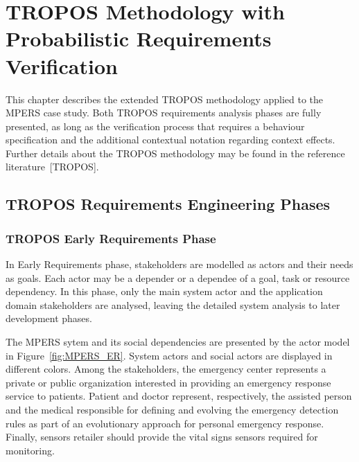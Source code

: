 \chapter{TROPOS Methodology with Probabilistic Requirements Verification}\label{ch_proposal}

This chapter describes the extended TROPOS methodology applied to the MPERS case study. Both TROPOS requirements analysis phases are fully presented, as long as the verification process that requires a behaviour specification and the additional contextual notation regarding context effects. Further details about the TROPOS methodology may be found in the reference literature~[TROPOS]. 

\section{TROPOS Requirements Engineering Phases}

\subsection{TROPOS Early Requirements Phase}

In Early Requirements phase, stakeholders are modelled as actors and their needs as goals. Each actor may be a depender or a dependee of a goal, task or resource dependency. In this phase, only the main system actor and the application domain stakeholders are analysed, leaving the detailed system analysis to later development phases.

The MPERS sytem and its social dependencies are presented by the actor model in Figure~\ref{fig:MPERS_ER}. System actors and social actors are displayed in different colors. Among the stakeholders, the emergency center represents a private or public organization interested in providing an emergency response service to patients. Patient and doctor represent, respectively, the assisted person and the medical responsible for defining and evolving the emergency detection rules as part of an evolutionary approach for personal emergency response. Finally, sensors retailer should provide the vital signs sensors required for monitoring.

